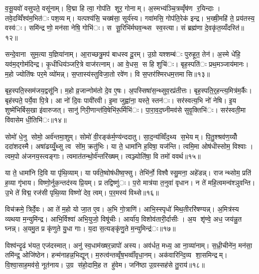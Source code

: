 व॒सू॒यवो॑ वसुपते॒ वसू॑नाम्। वि॒द्मा हि त्वा॒ गोप॑ति शूर॒ गोनाम्। अ॒स्मभ्य॑ञ्चि॒त्रव्वृँष॑ण र॒यिन्दाः। तवे॒दव्विँश्व॑म॒भित॑ः पश॒व्यम्। यत्पश्य॑सि॒ चख्ष॑सा॒ सूर्य॑स्य। गवा॑मसि॒ गोप॑ति॒रेक॑ इन्द्र। भ॒ख्षी॒महि॑ ते॒ प्रय॑तस्य॒ वस्व॑ः। समि॑न्द्र णो॒ मन॑सा नेषि॒ गोभि॑ः। स सू॒रिभि॑र्मघव॒न्थ्स स्व॒स्त्या। सं ब्रह्म॑णा दे॒वकृ॑त॒य्यँदस्ति॑॥१२॥

सन्दे॒वाना सुम॒त्या य॒ज्ञिया॑नाम्। आ॒राच्छत्रु॒मप॑ बाधस्व दू॒रम्। उ॒ग्रो यश्शम्ब॑ः पुरुहूत॒ तेन॑। अ॒स्मे धे॑हि॒ यव॑म॒द्गोम॑दिन्द्र। कृ॒धीधिय॑ञ्जरि॒त्रे वाज॑रत्नाम्। आ वे॒धस॒ स हि शुचि॑ः। बृह॒स्पति॑ः प्रथ॒मञ्जाय॑मानः। म॒हो ज्योति॑षः पर॒मे व्यो॑मन्न्। स॒प्तास्य॑स्तुविजा॒तो रवे॑ण। वि स॒प्तर॑श्मिरधम॒त्तमासि॥१३॥

बृह॒स्पति॒स्सम॑जय॒द्वसू॑नि। म॒हो व्र॒जान्गोम॑तो दे॒व ए॒षः। अ॒पस्सिषा॑स॒न्थ्सुव॒रप्र॑तीत्तः। बृह॒स्पति॒र्॒हन्त्य॒मित्र॑म॒र्कैः। बृह॑स्पते॒ पर्ये॒वा पि॒त्रे। आ नो॑ दि॒वः पावी॑रवी। इ॒मा जुह्वा॑ना॒ यस्ते॒ स्तन॑ः। सर॑स्वत्य॒भि नो॑ नेषि। इ॒य शुष्मे॑भिर्बिस॒खा इ॑वारुजत्। सानु॑ गिरी॒णान्त॑वि॒षेभि॑रू॒र्मिभि॑ः। पा॒रा॒व॒द॒घ्नीमव॑से सुवृ॒क्तिभि॑ः। सर॑स्वती॒मा वि॑वासेम धी॒तिभि॑ः॥१४॥


सोमो॑ धे॒नु सोमो॒ अर्व॑न्तमा॒शुम्। सोमो॑ वी॒रङ्क॑र्म॒ण्य॑न्ददातु। सा॒द॒न्य॑व्विँद॒थ्य स॒भेयम्। पि॒तु॒श्श्रव॑ण॒य्योँ ददा॑शदस्मै। अषा॑ढय्युँ॒थ्सु त्व सो॑म॒ क्रतु॑भिः। या ते॒ धामा॑नि ह॒विषा॒ यज॑न्ति। त्वमि॒मा ओष॑धीस्सोम॒ विश्वाः। त्वम॒पो अ॑जनय॒स्त्वङ्गाः। त्वमात॑तन्थो॒र्व॑न्तरि॑ख्षम्। त्वञ्ज्योति॑षा॒ वि तमो॑ ववर्थ॥१५॥

या ते॒ धामा॑नि दि॒वि या पृ॑थि॒व्याम्। या पर्व॑ते॒ष्वोष॑धीष्व॒फ्सु। तेभि॑र्नो॒ विश्वैस्सु॒मना॒ अहे॑डन्न्। राजन्थ्सोम॒ प्रति॑ ह॒व्या गृ॑भाय। विष्णो॒र्नुक॒न्तद॑स्य प्रि॒यम्। प्र तद्विष्णु॑ः। प॒रो मात्र॑या त॒नुवा॑ वृधान। न ते॑ महि॒त्वमन्व॑श्ञुवन्ति। उ॒भे ते॑ विद्म॒ रज॑सी पृथि॒व्या विष्णो॑ देव॒ त्वम्। प॒र॒मस्य॑ विथ्से॥१६॥

विच॑क्रमे॒ त्रिर्दे॒वः। आ ते॑ म॒हो यो जा॒त ए॒व। अ॒भि गो॒त्राणि॑। आभि॒स्स्पृधो॑ मिथ॒तीररि॑षण्यन्न्। अ॒मित्र॑स्य व्यथया म॒न्युमि॑न्द्र। आभि॒र्विश्वा॑ अभि॒युजो॒ विषू॑चीः। आर्या॑य॒ विशोव॑तारी॒र्दासीः। अ॒य शृ॑ण्वे॒ अध॒ जय॑न्नु॒त घ्नन्न्। अ॒यमु॒त प्र कृ॑णुते यु॒धा गाः। य॒दा स॒त्यङ्कृ॑णु॒ते म॒न्युमिन्द्र॑ः॥१७॥

विश्व॑न्दृ॒ढं भ॑यत॒ एज॑दस्मात्। अनु॑ स्व॒धाम॑ख्षर॒न्नापो॑ अस्य। अव॑र्धत॒ मध्य॒ आ ना॒व्या॑नाम्। स॒ध्री॒चीने॑न॒ मन॑सा॒ तमि॑न्द्र॒ ओजि॑ष्ठेन। हन्म॑नाहन्न॒भिद्यून्। म॒रुत्व॑न्तव्वृँष॒भव्वाँ॑वृधा॒नम्। अक॑वारिन्दि॒व्य शा॒समिन्द्रम्। वि॒श्वा॒साह॒मव॑से॒ नूत॑नाय। उ॒ग्र स॑हो॒दामि॒ह त हु॑वेम। जनि॑ष्ठा उ॒ग्रस्सह॑से तु॒राय॑॥१८॥

